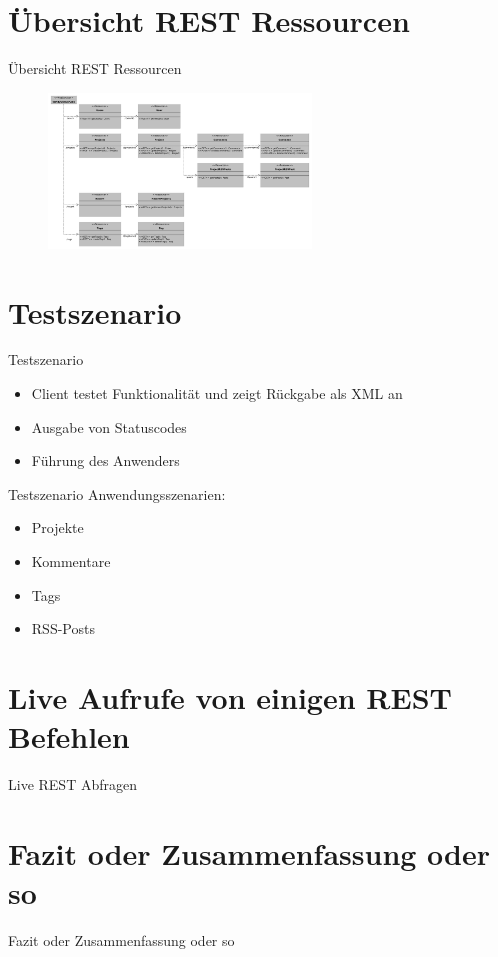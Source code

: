 \documentclass{beamer}
\begin{document}
	\section{Übersicht REST Ressourcen}
		\begin{frame}{Übersicht REST Ressourcen}
			\begin{figure}
				\centering
				\includegraphics[height=156]{Bilder/rest.pdf} 
			\end{figure}	
		\end{frame}
	\section{Testszenario}
		\begin{frame}{Testszenario}
			\begin{itemize}
				\item Client testet Funktionalität und zeigt Rückgabe als XML an
				\item Ausgabe von Statuscodes
				\item Führung des Anwenders
			\end{itemize}
		
		\end{frame}
		\begin{frame}{Testszenario}
		Anwendungsszenarien:
			\begin{itemize}
				\item Projekte
				\item Kommentare
				\item Tags
				\item RSS-Posts
			\end{itemize}
				
		\end{frame}
		
	\section{Live Aufrufe von einigen REST Befehlen}
		\begin{frame}{Live REST Abfragen}
			
		\end{frame}
		
	\section{Fazit oder Zusammenfassung oder so}
		\begin{frame}{Fazit oder Zusammenfassung oder so}
			
		\end{frame}
	
	
\end{document}
